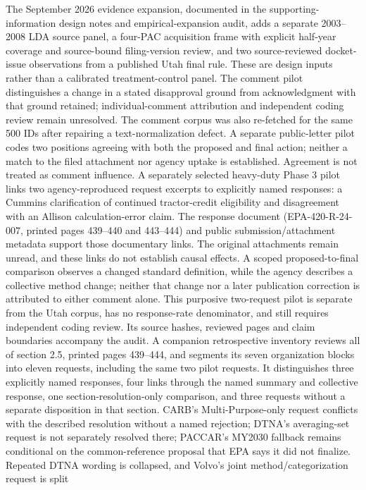 The September 2026 evidence expansion, documented in the supporting-information
design notes and empirical-expansion audit, adds a separate 2003--2008 LDA source
panel, a four-PAC acquisition frame with explicit half-year coverage and
source-bound filing-version review, and two source-reviewed docket-issue
observations from a published Utah final rule. These are design inputs rather
than a calibrated treatment-control panel. The comment pilot distinguishes a
change in a stated disapproval ground from acknowledgment with that ground
retained; individual-comment attribution and independent coding review remain
unresolved. The comment corpus was also re-fetched for the same 500 IDs after
repairing a text-normalization defect. A separate public-letter pilot codes two
positions agreeing with both the proposed and final action; neither a match to
the filed attachment nor agency uptake is established. Agreement is not treated
as comment influence. A separately selected heavy-duty Phase 3 pilot links
two agency-reproduced request excerpts to explicitly named responses: a Cummins
clarification of continued tractor-credit eligibility and disagreement with an
Allison calculation-error claim. The response document (EPA-420-R-24-007,
printed pages 439--440 and 443--444) and public submission/attachment metadata
support those documentary links. The original attachments remain unread, and
these links do not establish causal effects. A scoped proposed-to-final comparison
observes a changed standard
definition, while the agency describes a collective method change; neither that
change nor a later publication correction is attributed to either comment alone.
This purposive two-request pilot is separate from the Utah corpus, has no
response-rate denominator, and still requires independent coding review. Its
source hashes, reviewed pages and claim boundaries accompany the audit.
A companion retrospective inventory reviews all of section 2.5, printed pages
439--444, and segments its seven organization blocks into eleven requests,
including the same two pilot requests. It distinguishes three explicitly named
responses, four links through the named summary and collective response, one
section-resolution-only comparison, and three requests without a separate
disposition in that section. CARB's Multi-Purpose-only request conflicts with the
described resolution without a named rejection; DTNA's averaging-set request is
not separately resolved there; PACCAR's MY2030 fallback remains conditional on
the common-reference proposal that EPA says it did not finalize. Repeated DTNA
wording is collapsed, and Volvo's joint method/categorization request is split
